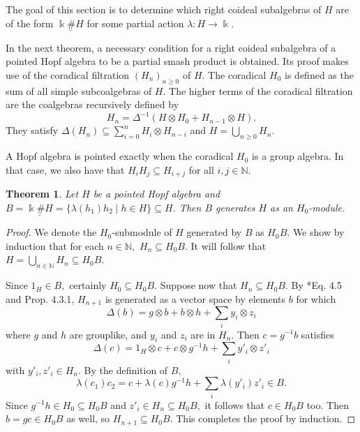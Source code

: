 \documentclass[reqno]{amsart}
\newtheorem{theorem}[thm]{Theorem}
\theoremstyle{definition}
\numberwithin{equation}{section}\theoremstyle{plain}
\theoremstyle{definition}
\def \k {\Bbbk}
\begin{document}
    The goal of this section is to determine which right coideal subalgebras of \(H\) are of the form \(\underline{\k \# H}\) for some partial action \(\lambda : H \to \k\). 

 In the next theorem, a necessary condition for a right coideal subalgebra of a pointed Hopf algebra to be a partial smash product is obtained. Its proof makes use of the coradical filtration \((H_n)_{n \geq 0}\) of \(H\). The coradical \(H_0\) is defined as the sum of all simple subcoalgebras of \(H\).  The higher terms of the coradical filtration are the coalgebras recursively defined by \[H_n = \Delta^{-1}(H \otimes H_0 + H_{n - 1} \otimes H).\] They satisfy 
\(\Delta(H_n) \subseteq \sum_{i = 0}^n H_i \otimes H_{n - i}\)
and 
\(H = \bigcup_{n \geq 0} H_n.\)

A Hopf algebra is pointed exactly when the coradical \(H_0\) is a group algebra. In that case, we also have that \(H_i H_j \subseteq H_{i + j}\) for all \(i, j \in \mathbb{N}\).

\begin{theorem}
    Let \(H\) be a pointed Hopf algebra and \(B = \underline{\Bbbk \# H} = \{\lambda(h_1) h_2 \mid h \in H\} \subseteq H\). Then \(B\) generates \(H\) as an \(H_0\)-module. 
\end{theorem}
\begin{proof}
    We denote the \(H_0\)-submodule of \(H\) generated by \(B\) as \(H_0B\). We show by induction that for each \(n \in \mathbb{N},\) \(H_n \subseteq H_0 B\). It will follow that \(H = \bigcup_{n \in \mathbb{N}} H_n \subseteq H_0 B\).

    Since \(1_H \in B,\) certainly \(H_0 \subseteq H_0 B\). Suppose now that \(H_n \subseteq H_0 B\). By \cite{radford}*{Eq. 4.5 and Prop. 4.3.1}, \(H_{n + 1}\) is generated as a vector space by elements \(b\) for which 
    \[\Delta(b) = g \otimes b + b \otimes h + \sum_i y_i \otimes z_i\]
    where \(g\) and \(h\) are grouplike, and \(y_i\) and \(z_i\) are in \(H_n\). Then \(c = g^{-1} b\) satisfies
    \[
    \Delta(c) = 1_H \otimes c + c \otimes g^{-1} h + \sum_i y'_i \otimes z'_i
    \]
    with \(y'_i, z'_i \in H_n\). By the definition of \(B,\)
    \[
    \lambda(c_1) c_2 = c + \lambda(c) g^{-1} h + \sum_i \lambda(y'_i) z'_i \in B.
    \]
    Since \(g^{-1} h \in H_0 \subseteq H_0 B\) and \(z'_i \in H_n \subseteq H_0 B,\) it follows that \(c \in H_0 B\) too. Then \(b = gc \in H_0 B\) as well, so \(H_{n + 1} \subseteq H_0 B\). This completes the proof by induction.  
\end{proof}
\end{document}
